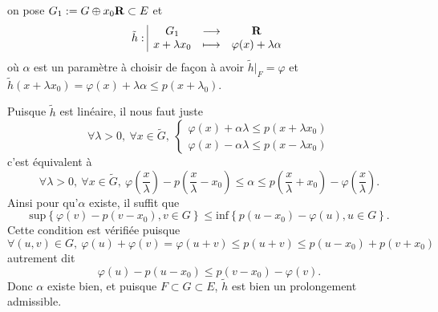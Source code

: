\documentclass[a4paper,11pt, twoside]{article}
\begin{document}
\begin{Proof}
  on pose $G_1:= G\oplus x_0\mathbf R\subset E$ et 
  $$\tilde h:\begin{array}{|ccc}
    G_1&\longrightarrow&\mathbf R\\
    x+\lambda x_0&\longmapsto&\varphi(x)+\lambda\alpha
  \end{array}$$
  où $\alpha$ est un paramètre à choisir de façon à avoir $\tilde h\big|_F=\varphi$ et $\tilde h(x+\lambda x_0)=\varphi(x)+\lambda\alpha\leqslant p(x+\lambda _0)$. 


  Puisque $\tilde h$ est linéaire, il nous faut \og juste\fg\ 
  $$\forall \lambda>0,\ \forall x\in \tilde G,\ \begin{cases}
    \varphi(x)+\alpha\lambda\leqslant p(x+\lambda x_0)\\
    \varphi(x)-\alpha\lambda\leqslant p(x-\lambda x_0)
  \end{cases}$$
  c'est équivalent à 
  $$\forall \lambda>0,\ \forall x\in\tilde G,\ \varphi\left(\frac{x}{\lambda}\right)-p\left(\frac{x}{\lambda}-x_0\right)\leqslant \alpha\leqslant p\left(\frac{x}{\lambda}+x_0\right)-\varphi\left(\frac{x}{\lambda}\right).$$
  Ainsi pour qu'$\alpha$ existe, il suffit que 
  $$\mathrm{sup}\left\{\varphi\left(v\right)-p\left(v-x_0\right), v\in G\right\}\leqslant \mathrm{inf}\left\{p\left(u-x_0\right)-\varphi\left(u\right), u\in G\right\}.$$
  Cette condition est vérifiée puisque 
  $$\forall (u,v)\in G,\ \varphi(u)+\varphi(v)=\varphi(u+v)\leqslant p(u+v)\leqslant p(u-x_0)+p(v+x_0)$$
  autrement dit 
  $$\varphi(u)-p(u-x_0)\leqslant p(v-x_0)-\varphi(v).$$
  Donc $\alpha$ existe bien, et puisque $F\subset G\subset E$, $\tilde h$ est bien un prolongement admissible.
\end{Proof}
\end{document}

